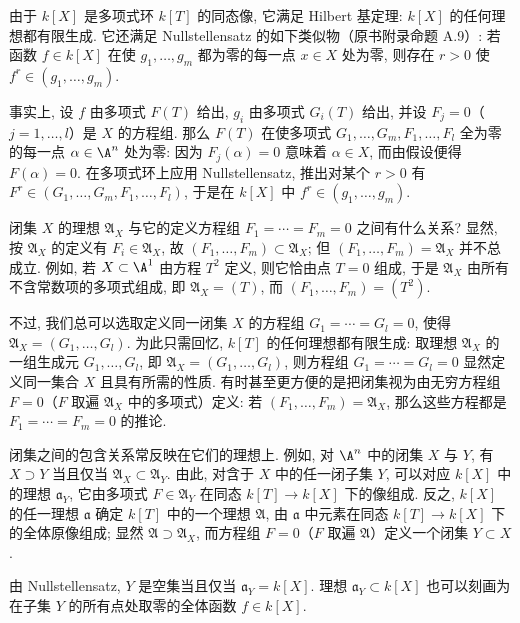 由于 $k[X]$ 是多项式环 $k[T]$ 的同态像, 它满足 Hilbert 基定理: $k[X]$ 的任何理想都有限生成. 它还满足 Nullstellensatz 的如下类似物（原书附录命题 A.9）: 若函数 $f \in k[X]$ 在使 $g_1, \ldots, g_m$ 都为零的每一点 $x \in X$ 处为零, 则存在 $r > 0$ 使 $f^r \in (g_1, \ldots, g_m)$.

事实上, 设 $f$ 由多项式 $F(T)$ 给出, $g_i$ 由多项式 $G_i(T)$ 给出, 并设 $F_j = 0$（$j = 1, \ldots, l$）是 $X$ 的方程组. 那么 $F(T)$ 在使多项式 $G_1, \ldots, G_m, F_1, \ldots, F_l$ 全为零的每一点 $\alpha \in \A^n$ 处为零: 因为 $F_j(\alpha) = 0$ 意味着 $\alpha \in X$, 而由假设便得 $F(\alpha) = 0$. 在多项式环上应用 Nullstellensatz, 推出对某个 $r > 0$ 有 $F^r \in (G_1, \ldots, G_m, F_1, \ldots, F_l)$, 于是在 $k[X]$ 中 $f^r \in (g_1, \ldots, g_m)$.

闭集 $X$ 的理想 $\mathfrak A_X$ 与它的定义方程组 $F_1 = \cdots = F_m = 0$ 之间有什么关系? 显然, 按 $\mathfrak A_X$ 的定义有 $F_i \in \mathfrak A_X$, 故 $(F_1, \ldots, F_m) \subset \mathfrak A_X$; 但 $(F_1, \ldots, F_m) = \mathfrak A_X$ 并不总成立. 例如, 若 $X \subset \A^1$ 由方程 $T^2$ 定义, 则它恰由点 $T = 0$ 组成, 于是 $\mathfrak A_X$ 由所有不含常数项的多项式组成, 即 $\mathfrak A_X = (T)$, 而 $(F_1, \ldots, F_m) = (T^2)$.

不过, 我们总可以选取定义同一闭集 $X$ 的方程组 $G_1 = \cdots = G_l = 0$, 使得 $\mathfrak A_X = (G_1, \ldots, G_l)$. 为此只需回忆, $k[T]$ 的任何理想都有限生成: 取理想 $\mathfrak A_X$ 的一组生成元 $G_1, \ldots, G_l$, 即 $\mathfrak A_X = (G_1, \ldots, G_l)$, 则方程组 $G_1 = \cdots = G_l = 0$ 显然定义同一集合 $X$ 且具有所需的性质. 有时甚至更方便的是把闭集视为由无穷方程组 $F = 0$（$F$ 取遍 $\mathfrak A_X$ 中的多项式）定义: 若 $(F_1, \ldots, F_m) = \mathfrak A_X$, 那么这些方程都是 $F_1 = \cdots = F_m = 0$ 的推论.

闭集之间的包含关系常反映在它们的理想上. 例如, 对 $\A^n$ 中的闭集 $X$ 与 $Y$, 有 $X \supset Y$ 当且仅当 $\mathfrak A_X \subset \mathfrak A_Y$. 由此, 对含于 $X$ 中的任一闭子集 $Y$, 可以对应 $k[X]$ 中的理想 $\mathfrak a_Y$, 它由多项式 $F \in \mathfrak A_Y$ 在同态 $k[T] \to k[X]$ 下的像组成. 反之, $k[X]$ 的任一理想 $\mathfrak a$ 确定 $k[T]$ 中的一个理想 $\mathfrak A$, 由 $\mathfrak a$ 中元素在同态 $k[T] \to k[X]$ 下的全体原像组成; 显然 $\mathfrak A \supset \mathfrak A_X$, 而方程组 $F = 0$（$F$ 取遍 $\mathfrak A$）定义一个闭集 $Y \subset X$.

由 Nullstellensatz, $Y$ 是空集当且仅当 $\mathfrak a_Y = k[X]$. 理想 $\mathfrak a_Y \subset k[X]$ 也可以刻画为在子集 $Y$ 的所有点处取零的全体函数 $f \in k[X]$.

